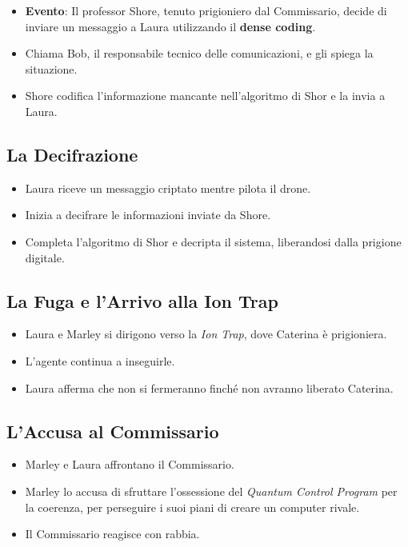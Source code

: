 \begin{itemize}
    \item \textbf{Evento}: Il professor Shore, tenuto prigioniero dal Commissario, decide di inviare un messaggio a Laura utilizzando il \textbf{dense coding}.
    \item Chiama Bob, il responsabile tecnico delle comunicazioni, e gli spiega la situazione.
    \item Shore codifica l'informazione mancante nell'algoritmo di Shor e la invia a Laura.
\end{itemize}

\subsection*{La Decifrazione}

\begin{itemize}
    \item Laura riceve un messaggio criptato mentre pilota il drone.
    \item Inizia a decifrare le informazioni inviate da Shore.
    \item Completa l'algoritmo di Shor e decripta il sistema, liberandosi dalla prigione digitale.
\end{itemize}

\subsection*{La Fuga e l'Arrivo alla Ion Trap}

\begin{itemize}
    \item Laura e Marley si dirigono verso la \emph{Ion Trap}, dove Caterina è prigioniera.
    \item L'agente continua a inseguirle.
    \item Laura afferma che non si fermeranno finché non avranno liberato Caterina.
\end{itemize}

\subsection*{L'Accusa al Commissario}

\begin{itemize}
    \item Marley e Laura affrontano il Commissario.
    \item Marley lo accusa di sfruttare l'ossessione del \emph{Quantum Control Program} per la coerenza, per perseguire i suoi piani di creare un computer rivale.
    \item Il Commissario reagisce con rabbia.
\end{itemize}

